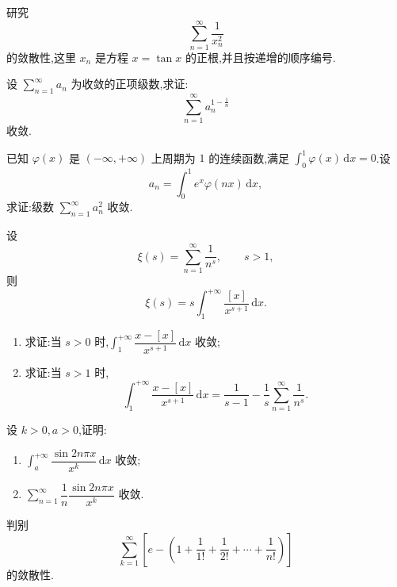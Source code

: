 \documentclass[../../数学分析培优讲义.tex]{subfiles}
\begin{document}
\begin{example}
研究
\[
    \sum\limits_{n=1}^{\infty}\dfrac{1}{x_n^2}
\]
的敛散性,这里 $x_n$ 是方程 $x=\tan x$ 的正根,并且按递增的顺序编号.
\end{example}
\exampleblank

\begin{example}
设 $\displaystyle\sum\limits_{n=1}^{\infty}a_n$ 为收敛的正项级数,求证:
\[
    \sum\limits_{n=1}^{\infty}a_n^{1-\frac{1}{n}}
\]
收敛.
\end{example}
\exampleblank

\begin{example}
已知 $\varphi(x)$ 是 $(-\infty,+\infty)$ 上周期为 $1$ 的连续函数,满足 $\displaystyle\int_0^1\varphi(x)\,\mathrm{d}x=0$.设
\[
    a_n=\int_0^1e^x\varphi(nx)\,\mathrm{d}x,
\]
求证:级数 $\displaystyle\sum\limits_{n=1}^{\infty}a_n^2$ 收敛.
\end{example}
\exampleblank

\begin{example}[\markstar]
设
\[
    \xi(s)=\sum\limits_{n=1}^{\infty}\dfrac{1}{n^s},
    \qquad s>1,
\]
则
\[
    \xi(s)=s\int_1^{+\infty}\dfrac{[x]}{x^{s+1}}\,\mathrm{d}x.
\]
\end{example}
\exampleblank

\begin{example}[\markstar]
\begin{enumerate}[label=(\arabic*)]
    \item 求证:当 $s>0$ 时,$\displaystyle\int_1^{+\infty}\dfrac{x-[x]}{x^{s+1}}\,\mathrm{d}x$ 收敛;
    \item 求证:当 $s>1$ 时,
    \[
        \int_1^{+\infty}\dfrac{x-[x]}{x^{s+1}}\,\mathrm{d}x
        =\dfrac{1}{s-1}-\dfrac{1}{s}\sum\limits_{n=1}^{\infty}\dfrac{1}{n^s}.
    \]
\end{enumerate}
\end{example}
\exampleblank

\begin{example}
设 $k>0,a>0$,证明:
\begin{enumerate}[label=(\arabic*)]
    \item $\displaystyle\int_a^{+\infty}\dfrac{\sin2n\pi x}{x^k}\,\mathrm{d}x$ 收敛;
    \item $\displaystyle\sum\limits_{n=1}^{\infty}\dfrac{1}{n}\dfrac{\sin2n\pi x}{x^k}$ 收敛.
\end{enumerate}
\end{example}
\exampleblank

\begin{example}
判别
\[
    \sum\limits_{k=1}^{\infty}\left[e-\left(1+\dfrac{1}{1!}+\dfrac{1}{2!}+\cdots+\dfrac{1}{n!}\right)\right]
\]
的敛散性.
\end{example}
\exampleblank
\end{document}
